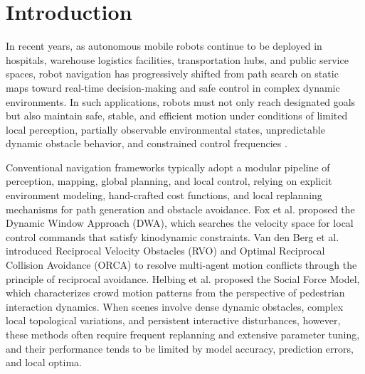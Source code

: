 
\section{Introduction}
\label{sec:introduction}

In recent years, as autonomous mobile robots continue to be deployed in hospitals, warehouse logistics facilities, transportation hubs, and public service spaces, robot navigation has progressively shifted from path search on static maps toward real-time decision-making and safe control in complex dynamic environments. In such applications, robots must not only reach designated goals but also maintain safe, stable, and efficient motion under conditions of limited local perception, partially observable environmental states, unpredictable dynamic obstacle behavior, and constrained control frequencies \cite{1}.

Conventional navigation frameworks typically adopt a modular pipeline of perception, mapping, global planning, and local control, relying on explicit environment modeling, hand-crafted cost functions, and local replanning mechanisms for path generation and obstacle avoidance. Fox et al. \cite{2} proposed the Dynamic Window Approach (DWA), which searches the velocity space for local control commands that satisfy kinodynamic constraints. Van den Berg et al. introduced Reciprocal Velocity Obstacles (RVO) \cite{3} and Optimal Reciprocal Collision Avoidance (ORCA) \cite{4} to resolve multi-agent motion conflicts through the principle of reciprocal avoidance. Helbing et al. \cite{5} proposed the Social Force Model, which characterizes crowd motion patterns from the perspective of pedestrian interaction dynamics. When scenes involve dense dynamic obstacles, complex local topological variations, and persistent interactive disturbances, however, these methods often require frequent replanning and extensive parameter tuning, and their performance tends to be limited by model accuracy, prediction errors, and local optima.

